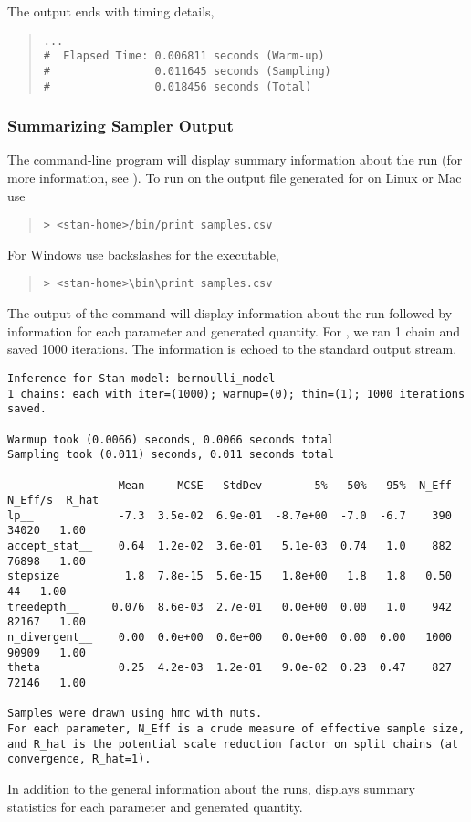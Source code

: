 The output ends with timing details,%
\begin{quote}
\begin{Verbatim}[fontsize=\small]
...
#  Elapsed Time: 0.006811 seconds (Warm-up)
#                0.011645 seconds (Sampling)
#                0.018456 seconds (Total)
\end{Verbatim}
\end{quote}

\subsubsection{Summarizing Sampler Output}

The command-line program  will display summary
information about the run (for more information, see
). To run  on the output file
generated for  on Linux or Mac use
%
\begin{quote}
\begin{Verbatim}[fontshape=sl]
> <stan-home>/bin/print samples.csv
\end{Verbatim}
\end{quote}
%
For Windows use backslashes for the executable,
%
\begin{quote}
\begin{Verbatim}[fontshape=sl]
> <stan-home>\bin\print samples.csv
\end{Verbatim}
\end{quote}
%
The output of the command will display information about the run
followed by information for each parameter and generated quantity. For
, we ran 1 chain and saved 1000 iterations. The information is
echoed to the standard output stream.
%
\begin{Verbatim}[fontshape=sl,fontsize=\footnotesize]
Inference for Stan model: bernoulli_model
1 chains: each with iter=(1000); warmup=(0); thin=(1); 1000 iterations saved.

Warmup took (0.0066) seconds, 0.0066 seconds total
Sampling took (0.011) seconds, 0.011 seconds total

                 Mean     MCSE   StdDev        5%   50%   95%  N_Eff  N_Eff/s  R_hat
lp__             -7.3  3.5e-02  6.9e-01  -8.7e+00  -7.0  -6.7    390    34020   1.00
accept_stat__    0.64  1.2e-02  3.6e-01   5.1e-03  0.74   1.0    882    76898   1.00
stepsize__        1.8  7.8e-15  5.6e-15   1.8e+00   1.8   1.8   0.50       44   1.00
treedepth__     0.076  8.6e-03  2.7e-01   0.0e+00  0.00   1.0    942    82167   1.00
n_divergent__    0.00  0.0e+00  0.0e+00   0.0e+00  0.00  0.00   1000    90909   1.00
theta            0.25  4.2e-03  1.2e-01   9.0e-02  0.23  0.47    827    72146   1.00

Samples were drawn using hmc with nuts.
For each parameter, N_Eff is a crude measure of effective sample size,
and R_hat is the potential scale reduction factor on split chains (at 
convergence, R_hat=1).
\end{Verbatim}
%
In addition to the general information about the runs, 
displays summary statistics for each parameter and generated
quantity.

